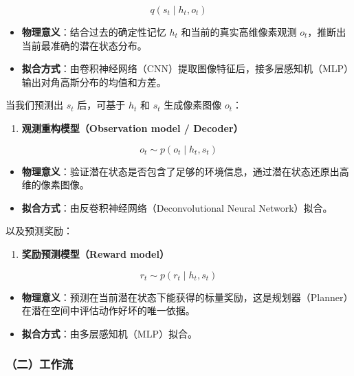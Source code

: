 \[
q(s_t \mid h_t, o_t)
\]

\begin{itemize}
\tightlist
\item
  \textbf{物理意义}：结合过去的确定性记忆 \(h_t\) 和当前的真实高维像素观测 \(o_t\)，推断出当前最准确的潜在状态分布。
\item
  \textbf{拟合方式}：由卷积神经网络（CNN）提取图像特征后，接多层感知机（MLP）输出对角高斯分布的均值和方差。
\end{itemize}

当我们预测出 \(s_t\) 后，可基于 \(h_t\) 和 \(s_t\) 生成像素图像 \(o_t\)：

\begin{enumerate}
\def\labelenumi{\arabic{enumi}.}
\setcounter{enumi}{3}
\tightlist
\item
  \textbf{观测重构模型（Observation model / Decoder）}
\end{enumerate}

\[
o_t \sim p(o_t \mid h_t, s_t)
\]

\begin{itemize}
\tightlist
\item
  \textbf{物理意义}：验证潜在状态是否包含了足够的环境信息，通过潜在状态还原出高维的像素图像。
\item
  \textbf{拟合方式}：由反卷积神经网络（Deconvolutional Neural Network）拟合。
\end{itemize}

以及预测奖励：

\begin{enumerate}
\def\labelenumi{\arabic{enumi}.}
\setcounter{enumi}{4}
\tightlist
\item
  \textbf{奖励预测模型（Reward model）}
\end{enumerate}

\[
r_t \sim p(r_t \mid h_t, s_t)
\]

\begin{itemize}
\tightlist
\item
  \textbf{物理意义}：预测在当前潜在状态下能获得的标量奖励，这是规划器（Planner）在潜在空间中评估动作好坏的唯一依据。
\item
  \textbf{拟合方式}：由多层感知机（MLP）拟合。
\end{itemize}

\hypertarget{ux4e8cux5de5ux4f5cux6d41-9}{%
\subsubsection{（二）工作流}\label{ux4e8cux5de5ux4f5cux6d41-9}}

